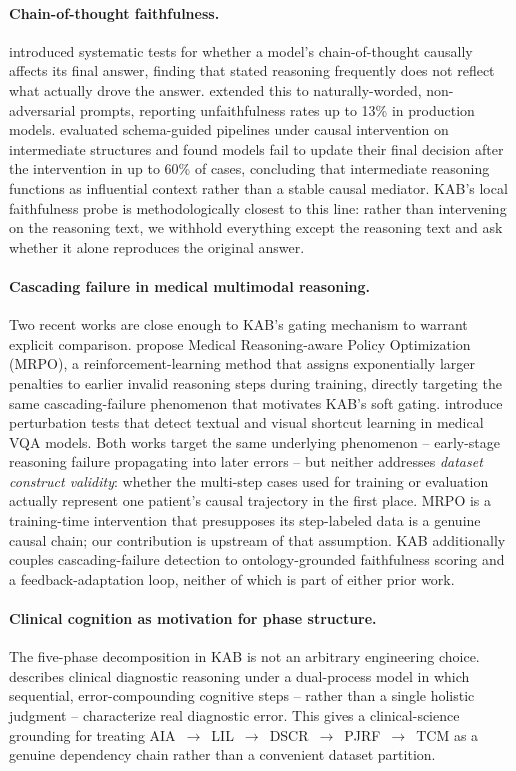 \documentclass[11pt]{article}
\begin{document}
\paragraph{Chain-of-thought faithfulness.} \citet{lanham2023measuring} introduced systematic tests for whether a model's chain-of-thought causally affects its final answer, finding that stated reasoning frequently does not reflect what actually drove the answer. \citet{arcuschin2025chainofthought} extended this to naturally-worded, non-adversarial prompts, reporting unfaithfulness rates up to 13\% in production models. \citet{somov2026breaking} evaluated schema-guided pipelines under causal intervention on intermediate structures and found models fail to update their final decision after the intervention in up to 60\% of cases, concluding that intermediate reasoning functions as influential context rather than a stable causal mediator. KAB's local faithfulness probe is methodologically closest to this line: rather than intervening on the reasoning text, we withhold everything except the reasoning text and ask whether it alone reproduces the original answer.

\paragraph{Cascading failure in medical multimodal reasoning.} Two recent works are close enough to KAB's gating mechanism to warrant explicit comparison. \citet{jung2026breaking} propose Medical Reasoning-aware Policy Optimization (MRPO), a reinforcement-learning method that assigns exponentially larger penalties to earlier invalid reasoning steps during training, directly targeting the same cascading-failure phenomenon that motivates KAB's soft gating. \citet{nguyen2025localizing} introduce perturbation tests that detect textual and visual shortcut learning in medical VQA models. Both works target the same underlying phenomenon -- early-stage reasoning failure propagating into later errors -- but neither addresses \emph{dataset construct validity}: whether the multi-step cases used for training or evaluation actually represent one patient's causal trajectory in the first place. MRPO is a training-time intervention that presupposes its step-labeled data is a genuine causal chain; our contribution is upstream of that assumption. KAB additionally couples cascading-failure detection to ontology-grounded faithfulness scoring and a feedback-adaptation loop, neither of which is part of either prior work.

\paragraph{Clinical cognition as motivation for phase structure.} The five-phase decomposition in KAB is not an arbitrary engineering choice. \citet{croskerry2009clinical} describes clinical diagnostic reasoning under a dual-process model in which sequential, error-compounding cognitive steps -- rather than a single holistic judgment -- characterize real diagnostic error. This gives a clinical-science grounding for treating AIA~$\rightarrow$~LIL~$\rightarrow$~DSCR~$\rightarrow$~PJRF~$\rightarrow$~TCM as a genuine dependency chain rather than a convenient dataset partition.
\end{document}
